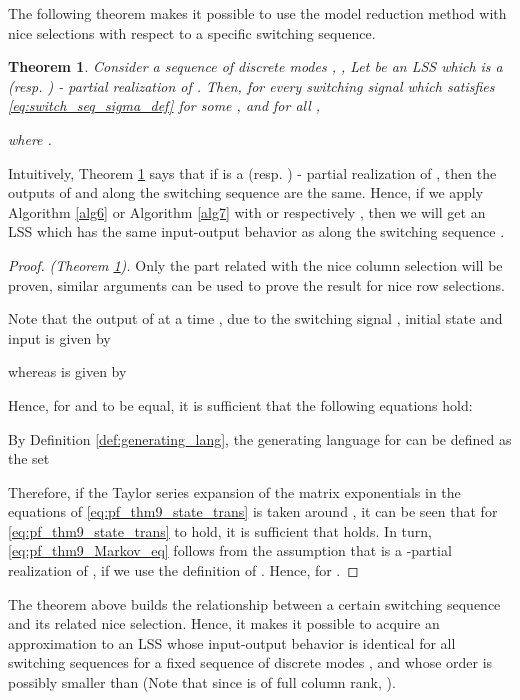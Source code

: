 \documentclass[journal]{IEEEtran}
\newtheorem{Theorem}{Theorem}
\begin{document}
The following theorem makes it possible to use the model reduction method with nice selections with respect to a specific switching sequence.

\begin{Theorem} \label{thm:nice_sel_switch_seq}
	Consider a sequence of discrete modes
	, , 
Let  be an LSS which is a  (resp. ) - partial realization of . Then, for every switching signal which satisfies \eqref{eq:switch_seq_sigma_def} for some , and for all ,
	  
	  where .
\end{Theorem}

Intuitively, Theorem \ref{thm:nice_sel_switch_seq} says that if  is a  (resp. ) - partial realization of , then the outputs of  and  along the switching sequence  are the same. Hence, if we apply Algorithm \ref{alg6} or Algorithm \ref{alg7} with  or respectively , then we will get an LSS  which has the same input-output behavior as  along the switching sequence .

\begin{proof}\emph{(Theorem \ref{thm:nice_sel_switch_seq}).}
	Only the part related with the nice column selection will be proven, similar arguments can be used to prove the result for
	nice row selections.
	
Note that the output of  at a time ,  due to the switching signal , initial state  and input  is given by
	
	whereas  is given by
	
	Hence, for  and  to be equal, it is sufficient that the following equations hold:
	
	By Definition \ref{def:generating_lang}, the generating language for  can be defined as the set
	
	Therefore, if the Taylor series expansion of the matrix exponentials in the equations of \eqref{eq:pf_thm9_state_trans} is taken around , it can be seen that for
	\eqref{eq:pf_thm9_state_trans} to hold, it is sufficient that  
	holds. In turn, \eqref{eq:pf_thm9_Markov_eq} follows from the
	assumption that  is a -partial
	realization of , if we use the definition of
	.
	Hence,  for .
\end{proof}


The theorem above builds the relationship between a certain switching sequence and its related nice selection. Hence, it makes it possible to acquire an approximation to an LSS whose input-output behavior is identical for all switching sequences  for a fixed sequence of discrete modes , and whose order  is possibly smaller than  (Note that since  is of full column rank, ).
\end{document}
